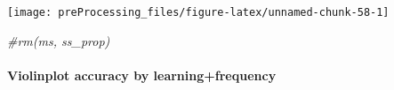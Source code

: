 \documentclass[
]{article}
\newenvironment{Shaded}{\begin{snugshade}}{\end{snugshade}}
\newcommand{\CommentTok}[1]{\textcolor[rgb]{0.56,0.35,0.01}{\textit{#1}}}
\begin{document}
\begin{center}\texttt{[image: preProcessing\_files/figure-latex/unnamed-chunk-58-1]} \end{center}

\begin{Shaded}
\begin{Highlighting}[]
\CommentTok{#rm(ms, ss_prop)}
\end{Highlighting}
\end{Shaded}

\hypertarget{violinplot-accuracy-by-learningfrequency}{%
\paragraph{Violinplot accuracy by
learning+frequency}\label{violinplot-accuracy-by-learningfrequency}}
\end{document}

